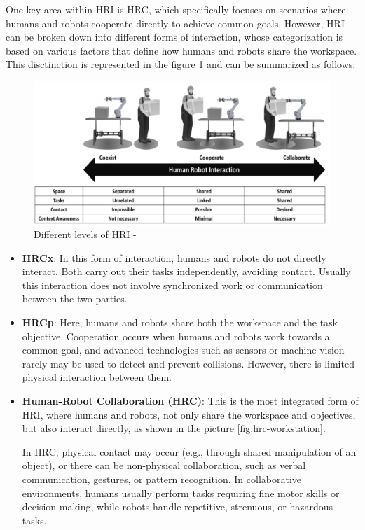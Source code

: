 One key area within \ac{HRI} is \ac{HRC}, which specifically focuses on scenarios where humans and robots cooperate directly to achieve common goals.
However, \ac{HRI} can be broken down into different forms of interaction, whose categorization is based on various factors that define how 
humans and robots share the workspace. This disctinction is represented in the figure \ref{fig:collab} \cite{Jahanmahin2022} and can be summarized as follows:

\begin{figure}[!htbp]
    \centering
    \includegraphics[width=1.0\linewidth]{figs/collab-coex-coopr.png}
    \caption{Different levels of \ac{HRI} - \cite{Jahanmahin2022}} 
    \label{fig:collab}
\end{figure} 

\begin{itemize}
    \item \textbf{\ac{HRCx}}: In this form of interaction, humans and robots do not directly interact.
    Both carry out their tasks independently, avoiding contact. Usually this interaction does not involve synchronized work 
    or communication between the two parties.

    \item \textbf{\ac{HRCp}}: Here, humans and robots share both the workspace and the task objective. Cooperation occurs when humans
    and robots work towards a common goal, and advanced technologies such as sensors or machine vision rarely may be used to detect and prevent collisions.
    However, there is limited physical interaction between them.

    \item \textbf{Human-Robot Collaboration (\ac{HRC})}: This is the most integrated form of \ac{HRI}, where humans and robots, not only share the workspace and
    objectives, but also interact directly, as shown in the picture \ref{fig:hrc-workstation}. 
    
    In \ac{HRC}, physical contact may occur (e.g., through shared manipulation of an object), or there can be non-physical
    collaboration, such as verbal communication, gestures, or pattern recognition. In collaborative environments, humans usually perform tasks requiring
    fine motor skills or decision-making, while robots handle repetitive, strenuous, or hazardous tasks.
\end{itemize}


